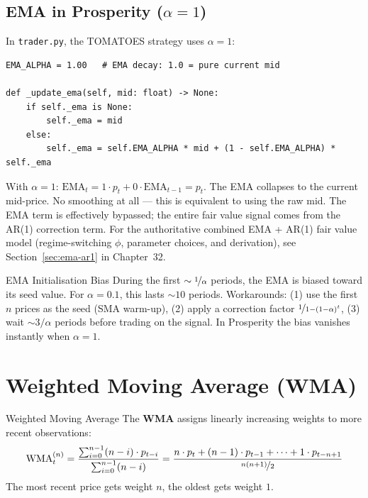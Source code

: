 \documentclass[12pt,a4paper,openany]{report}
\theoremstyle{definition}
\begin{document}
\subsection{EMA in Prosperity (\texorpdfstring{$\alpha = 1$}{alpha=1})}

In \texttt{trader.py}, the TOMATOES strategy uses $\alpha = 1$:
\begin{lstlisting}[caption={EMA with alpha=1 in TomatoesStrategy}]
EMA_ALPHA = 1.00   # EMA decay: 1.0 = pure current mid

def _update_ema(self, mid: float) -> None:
    if self._ema is None:
        self._ema = mid
    else:
        self._ema = self.EMA_ALPHA * mid + (1 - self.EMA_ALPHA) * self._ema
\end{lstlisting}

With $\alpha = 1$: $\text{EMA}_t = 1 \cdot p_t + 0 \cdot \text{EMA}_{t-1} = p_t$. The EMA collapses to the current mid-price. No smoothing at all — this is equivalent to using the raw mid. The EMA term is effectively bypassed; the entire fair value signal comes from the AR(1) correction term. For the authoritative combined EMA + AR(1) fair value model (regime-switching $\phi$, parameter choices, and derivation), see Section~\ref{sec:ema-ar1} in Chapter~32.

\begin{warningbox}{EMA Initialisation Bias}
During the first $\sim \nicefrac{1}{\alpha}$ periods, the EMA is biased toward its seed value. For $\alpha = 0.1$, this lasts $\sim 10$ periods. Workarounds: (1) use the first $n$ prices as the seed (SMA warm-up), (2) apply a correction factor $\nicefrac{1}{1-(1-\alpha)^t}$, (3) wait $\sim 3/\alpha$ periods before trading on the signal. In Prosperity the bias vanishes instantly when $\alpha = 1$.
\end{warningbox}

\section{Weighted Moving Average (WMA)}

\begin{definitionbox}{Weighted Moving Average}
The \textbf{WMA} assigns linearly increasing weights to more recent observations:
\[
  \text{WMA}_t^{(n)} = \frac{\sum_{i=0}^{n-1}(n-i)\cdot p_{t-i}}{\sum_{i=0}^{n-1}(n-i)} = \frac{n \cdot p_t + (n-1) \cdot p_{t-1} + \cdots + 1 \cdot p_{t-n+1}}{\nicefrac{n(n+1)}{2}}
\]
The most recent price gets weight $n$, the oldest gets weight $1$.
\end{definitionbox}
\end{document}
